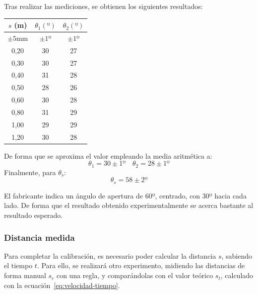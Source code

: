 \documentclass[10pt,a4paper,hidelinks,twocolumn,nobalancelastpage]{article}
\begin{document}
Tras realizar las mediciones, se obtienen los siguientes resultados:
\begin{center}
\begin{tabular}{ | c | c | c | }
\hline
$s$ (m) & $\theta_1(º)$ & $\theta_2(º)$ \\ \hline
$\pm5$mm & $\pm1º$ & $\pm1º$ \\ \hline \hline
0,20 & 30 & 27 \\ \hline
0,30 & 30 & 27 \\ \hline
0,40 & 31 & 28 \\ \hline
0,50 & 28 & 26 \\ \hline
0,60 & 30 & 28 \\ \hline
0,80 & 31 & 29 \\ \hline
1,00 & 29 & 29 \\ \hline
1,20 & 30 & 28 \\ \hline
\end{tabular}
\end{center}

De forma que se aproxima el valor empleando la media aritmética a:
$$ \theta_1 = 30 \pm 1º \quad \theta_2 = 28 \pm 1º $$
Finalmente, para $\theta_s$:
$$\theta_s = 58 \pm 2º$$

El fabricante indica un ángulo de apertura de 60º, centrado, con 30º hacia cada 
lado. De forma que el resultado obtenido experimentalmente se acerca bastante al 
resultado esperado.

%
\subsubsection{Distancia medida}

Para completar la calibración, es necesario poder calcular la distancia $s$,
sabiendo el tiempo $t$. Para ello, se realizará otro experimento, midiendo las
distancias de forma manual $s_r$ con una regla, y comparándolas con el valor
teórico $s_t$, calculado con la ecuación~\ref{eq:velocidad-tiempo}.
\end{document}
